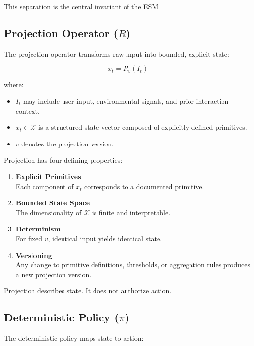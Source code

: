 \documentclass[11pt]{article}
\begin{document}
This separation is the central invariant of the ESM.

\subsection{Projection Operator ($R$)}

The projection operator transforms raw input into bounded, explicit state:

\[
x_t = R_v(I_t)
\]

where:

\begin{itemize}
  \item $I_t$ may include user input, environmental signals, and prior interaction context.
  \item $x_t \in \mathcal{X}$ is a structured state vector composed of explicitly defined primitives.
  \item $v$ denotes the projection version.
\end{itemize}

Projection has four defining properties:

\begin{enumerate}
  \item \textbf{Explicit Primitives} \\
  Each component of $x_t$ corresponds to a documented primitive.

  \item \textbf{Bounded State Space} \\
  The dimensionality of $\mathcal{X}$ is finite and interpretable.

  \item \textbf{Determinism} \\
  For fixed $v$, identical input yields identical state.

  \item \textbf{Versioning} \\
  Any change to primitive definitions, thresholds, or aggregation rules produces a new projection version.
\end{enumerate}

Projection describes state. It does not authorize action.

\subsection{Deterministic Policy ($\pi$)}

The deterministic policy maps state to action:
\end{document}
